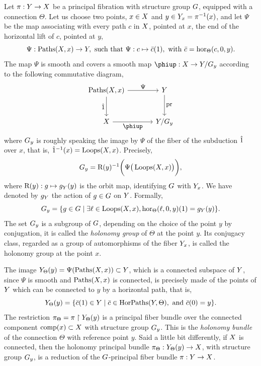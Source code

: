 \begin{article}
  \label{The-holonomy-of-a-connection}
  Let $\pi : Y \to  X$ be a principal fibration with structure group $G$,
  equipped with a connection $\Theta$.
  Let us choose two points,
  $x \in X$ and $y \in Y_x = \pi^{-1}(x)$,
  and let $\Psi$ be the map associating with every path $c$ in $X$,
  pointed at $x$,
  the end of the horizontal lift of $c$,
  pointed at $y$,
  $$%
  \Psi : \Paths(\X,x) \to \Y, \ \text{such that} \ \Psi : c \mapsto \bar c(1), \ \text{with} \ \bar c = \hor_\Theta(c,0,y).
  $$%
  The map $\Psi$ is smooth and covers a smooth map $\varphi : \X \to \Y/\G_y$ according to the following commutative diagram,
  \begin{equation}
    \renewcommand{\theequation}{$\clubsuit$}
    \begin{tikzcd}[column sep=large, row sep=large, every label/.append style = {font = \small}]
      \Paths(\X,x) \arrow[r,"\Psi"] \arrow[d, swap, "\1"] & \Y \arrow[d, "\pr"]  \\
      \X \arrow[r, swap, "\varphi"] & \Y/\G_y
    \end{tikzcd}
  \end{equation}
  where $G_y$ is roughly speaking the image by $\Psi$ of the fiber of the subduction $\hat 1$ over $x$,
  that is,
  $\hat 1^{-1}(x) = \operatorname{Loops}(X,x)$.
  Precisely,
  $$%
  \G_y = \orb{y}^{-1}\bigg(\Psi\big(\Loops(\X,x)\big)\bigg),
  $$%
  where $\mathrm{R}(y) : g \mapsto g_Y(y)$ is the orbit map,
  identifying $G$ with $Y_x$.
  We have denoted by $g_Y$ the action of $g \in G$ on $Y$.
  Formally,
  $$%
  \G_y = \{ g \in \G \mid \exists \ell \in \Loops(\X,x), \hor_\Theta(\ell,0,y)(1) = g_\Y(y) \}.
  $$%
  The set $G_y$ is a subgroup of $G$,
  depending on the choice of the point $y$ by conjugation,
  it is called the {\em holonomy group} of $\Theta$ at the point $y$.
  Its conjugacy class,
  regarded as a group of automorphisms of the fiber $Y_x$,
  is called the holonomy group at the point $x$.
  
  The image $Y_\Theta(y) = \Psi(\operatorname{Paths}(X,x)) \subset Y$,
  which is a connected subspace of $Y$,
  since $\Psi$ is smooth and $\operatorname{Paths}(X,x)$ is connected,
  is precisely made of the points of $Y$ which can be connected to $y$ by a horizontal path, that is,
  \begin{equation}
    \renewcommand{\theequation}{$\spadesuit$}
    \Y_\Theta(y) = \{\bar c(1) \in \Y \mid \bar c \in \HorPaths(\Y,\Theta), \text{ and } \bar c(0) = y \}.
  \end{equation}
  The restriction $\pi_\Theta = \pi \restriction Y_\Theta(y)$ is a principal fiber bundle over the connected component $\operatorname{comp}(x) \subset X$ with structure group $G_y$.
  This is the {\em holonomy bundle} of the connection $\Theta$ with reference point $y$.
  Said a little bit differently,
  if $X$ is connected,
  then the holonomy principal bundle $\pi_\Theta : Y_\Theta(y) \to X$,
  with structure group $G_y$, is a reduction  of the $G$-principal fiber bundle $\pi : Y \to X$.
  

\end{article}
